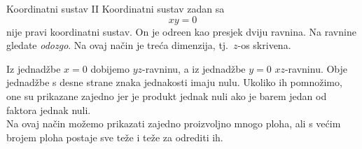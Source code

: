 \begin{surferPage}[Coordinates II]{Koordinatni sustav II}
Koordinatni sustav zadan sa
\[xy=0\]
nije pravi koordinatni sustav. On je odre\dj en kao presjek dviju ravnina. Na ravnine gledate {\it odozgo}. Na ovaj na\v cin je tre\' ca dimenzija, tj.\ $z$-os skrivena. 

\vspace{0.3cm}
Iz jednad\v zbe $x=0$ dobijemo $yz$-ravninu, a iz jednad\v zbe $y=0$ $xz$-ravninu.
Obje jednad\v zbe s desne strane znaka jednakosti imaju nulu. Ukoliko ih pomno\v zimo, one su prikazane zajedno jer je produkt jednak nuli ako je barem jedan od faktora jednak nuli. \\
Na ovaj na\v cin mo\v zemo prikazati zajedno proizvoljno mnogo ploha, ali s ve\' cim brojem ploha postaje sve te\v ze i te\v ze za odrediti ih.
\end{surferPage}
